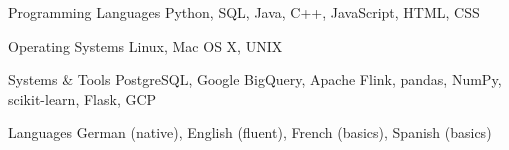 

\begin{cvskills}

  \cvskill
    {Programming Languages} %
    {Python, SQL, Java, C++, JavaScript,  HTML, CSS} %

  \cvskill
    {Operating Systems} %
    {Linux, Mac OS X, UNIX} %

  \cvskill
    {Systems \& Tools} %
    {PostgreSQL, Google BigQuery, Apache Flink, pandas, NumPy, scikit-learn, Flask, GCP} %

  \cvskill
    {Languages} %
    {German (native), English (fluent), French (basics), Spanish (basics)} %

\end{cvskills}
